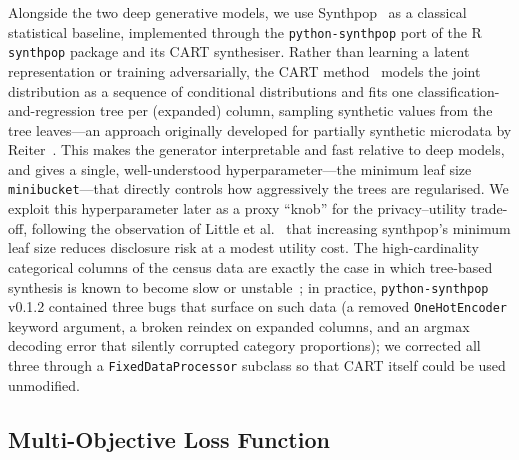 \documentclass[11pt]{article}
\begin{document}
Alongside the two deep generative models, we use Synthpop~\cite{nowok2016synthpop} as a classical statistical baseline, implemented through the \texttt{python-synthpop} port of the R \texttt{synthpop} package and its CART synthesiser. Rather than learning a latent representation or training adversarially, the CART method~\cite{breiman1984cart} models the joint distribution as a sequence of conditional distributions and fits one classification-and-regression tree per (expanded) column, sampling synthetic values from the tree leaves---an approach originally developed for partially synthetic microdata by Reiter~\cite{reiter2005cart}. This makes the generator interpretable and fast relative to deep models, and gives a single, well-understood hyperparameter---the minimum leaf size \texttt{minibucket}---that directly controls how aggressively the trees are regularised. We exploit this hyperparameter later as a proxy ``knob'' for the privacy--utility trade-off, following the observation of Little et al.~\cite{little2025synthetic} that increasing synthpop's minimum leaf size reduces disclosure risk at a modest utility cost. The high-cardinality categorical columns of the census data are exactly the case in which tree-based synthesis is known to become slow or unstable~\cite{raab2016practical}; in practice, \texttt{python-synthpop} v0.1.2 contained three bugs that surface on such data (a removed \texttt{OneHotEncoder} keyword argument, a broken reindex on expanded columns, and an argmax decoding error that silently corrupted category proportions); we corrected all three through a \texttt{FixedDataProcessor} subclass so that CART itself could be used unmodified.


\subsection{Multi-Objective Loss Function}
\end{document}
